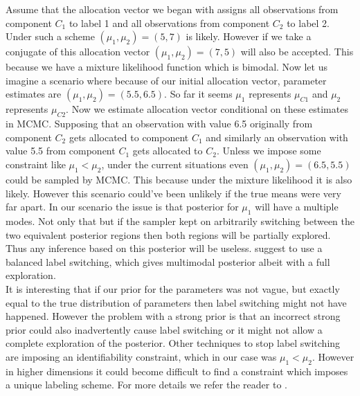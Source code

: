 Assume that the allocation vector we began with assigns all observations from component $C_1$ to label 1 and all observations from component $C_2$ to label 2. Under such a scheme $(\mu_1,\mu_2) = (5,7)$ is likely. However if we take a conjugate of this allocation vector $(\mu_1,\mu_2) = (7,5)$ will also be accepted. This because we have a mixture likelihood function which is bimodal. Now let us imagine a scenario where because of our initial allocation vector, parameter estimates are $(\mu_1, \mu_2) = (5.5,6.5)$. So far it seems $\mu_1$ represents $\mu_{C1}$ and $\mu_2$ represents $\mu_{C2}$. Now we estimate allocation vector conditional on these estimates in MCMC. Supposing that an observation with value 6.5 originally from component $C_2$ gets allocated to component $C_1$ and similarly an observation with value 5.5 from component $C_1$ gets allocated to $C_2$. Unless we impose some constraint like $\mu_1 < \mu_2$, under the current situations even $(\mu_1,\mu_2) = (6.5, 5.5)$ could be sampled by MCMC. This because under the mixture likelihood it is also likely. However this scenario could've been unlikely if the true means were very far apart. In our scenario the issue is that posterior for $\mu_1$ will have a multiple modes. Not only that but if the sampler kept on arbitrarily switching between the two equivalent posterior regions then both regions will be partially explored. Thus any inference based on this posterior will be useless. \citet[pg. 82]{fruhwirth-schnatter_finite_2013} suggest to use a balanced label switching, which gives multimodal posterior albeit with a full exploration.\\

It is interesting that if our prior for the parameters was not vague, but exactly equal to the true distribution of parameters then label switching might not have happened. However the problem with a strong prior is that an incorrect strong prior could also inadvertently cause label switching or it might not allow a complete exploration of the posterior. Other techniques to stop label switching are imposing an identifiability constraint, which in our case was $\mu_1 < \mu_2$. However in higher dimensions it could become difficult to find a constraint which imposes a unique labeling scheme. For more details we refer the reader to \citet{stephens_dealing_2000}.\\

